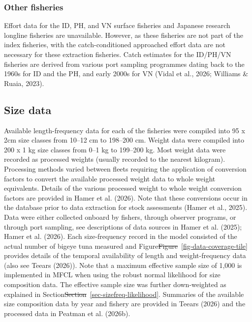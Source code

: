 \documentclass[
  english,
  a4paper,
  a4paper,
  11pt]{SCreport}
\providecommand{\DIFdel}[1]{{\protect\color{red}\sout{#1}}}                      %
\providecommand{\DIFdelbegin}{} %
\providecommand{\DIFdelend}{} %
\newcommand{\DIFscaledelfig}{0.5}
\newlength{\DIFdelgraphicswidth} %
\newlength{\DIFdelgraphicsheight} %
\newcommand{\DIFdelincludegraphics}[2][]{%
\sbox{\DIFdelgraphicsbox}{\DIFOincludegraphics[#1]{#2}}%
\settoboxwidth{\DIFdelgraphicswidth}{\DIFdelgraphicsbox} %
\settoboxtotalheight{\DIFdelgraphicsheight}{\DIFdelgraphicsbox} %
\scalebox{\DIFscaledelfig}{%
\parbox[b]{\DIFdelgraphicswidth}{\usebox{\DIFdelgraphicsbox}\\[-\baselineskip] \rule{\DIFdelgraphicswidth}{0em}}\llap{\resizebox{\DIFdelgraphicswidth}{\DIFdelgraphicsheight}{%
\setlength{\unitlength}{\DIFdelgraphicswidth}%
\begin{picture}(1,1)%
\thicklines\linethickness{2pt} %
{\color[rgb]{1,0,0}\put(0,0){\framebox(1,1){}}}%
{\color[rgb]{1,0,0}\put(0,0){\line( 1,1){1}}}%
{\color[rgb]{1,0,0}\put(0,1){\line(1,-1){1}}}%
\end{picture}%
}\hspace*{3pt}}} %
} %
\DeclareRobustCommand{\DIFdelbegin}{\DIFOdelbegin \let\includegraphics\DIFdelincludegraphics} %
\DeclareRobustCommand{\DIFdelend}{\DIFOaddend \let\includegraphics\DIFOincludegraphics} %
\begin{document}
\subsubsection{Other fisheries}\label{sec-catch-effort-other}

Effort data for the ID, PH, and VN surface fisheries and Japanese
research longline fisheries are unavailable. However, as these fisheries
are not part of the index fisheries, with the catch-conditioned
approached effort data are not necessary for these extraction fisheries.
Catch estimates for the ID/PH/VN fisheries are derived from various port
sampling programmes dating back to the 1960s for ID and the PH, and
early 2000s for VN (Vidal et al., 2026; Williams \& Ruaia, 2023).

\subsection{Size data}\label{sec-size-data}

Available length-frequency data for each of the fisheries were compiled
into 95 x 2cm size classes from 10--12 cm to 198--200 cm. Weight data
were compiled into 200 x 1 kg size classes from 0--1 kg to 199--200 kg.
Most weight data were recorded as processed weights (usually recorded to
the nearest kilogram). Processing methods varied between fleets
requiring the application of conversion factors to convert the available
processed weight data to whole weight equivalents. Details of the
various processed weight to whole weight conversion factors are provided
in Hamer et al. (2026). Note that these conversions occur in the
database prior to data extraction for stock assessments (Hamer et al.,
2025). Data were either collected onboard by fishers, through observer
programs, or through port sampling, see descriptions of data sources in
Hamer et al. (2025); Hamer et al. (2026). Each size-frequency record in
the model consisted of the actual number of bigeye tuna measured and
Figure\DIFdelbegin \DIFdel{Figure}\DIFdelend ~\ref{fig-data-coverage-tile} provides details of the temporal
availability of length and weight-frequency data (also see Teears
(2026)). Note that a maximum effective sample size of 1,000 is
implemented in MFCL when using the robust normal likelihood for size
composition data. The effective sample size was further down-weighted as
explained in Section\DIFdelbegin \DIFdel{Section}\DIFdelend ~\ref{sec-sizefreq-likelihood}. Summaries of the
available size composition data by year and fishery are provided in
Teears (2026) and the processed data in Peatman et al. (2026b).
\end{document}
